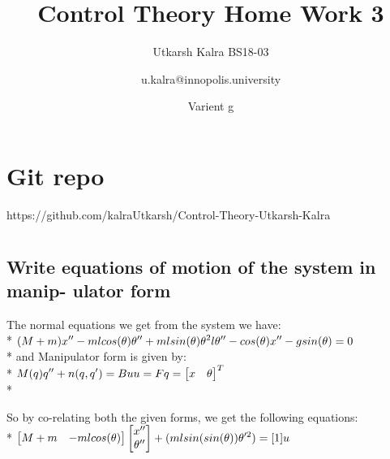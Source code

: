 \documentclass{article}
\title{Control Theory Home Work 3}
\author{Utkarsh Kalra BS18-03 \and u.kalra@innopolis.university }
\date{Varient g}
\begin{document}
\maketitle

\section{Git repo}
https://github.com/kalraUtkarsh/Control-Theory-Utkarsh-Kalra


\section{}
\subsection{Write equations of motion of the system in manip-
ulator form}

The normal equations we get from the system we have:\\*
$
{\centering}\displaystyle(M+m)x''-mlcos(\theta)\theta''+mlsin(\theta)\theta^2 \\*
l\theta''-cos(\theta)x''-gsin(\theta)=0\\*
$\\*
and Manipulator form is given by:\\*
$
\displaystyle M(q)q''+n(q,q')=Bu\\*
u = F\\*
q = \begin{bmatrix}
x & \theta\\
\end{bmatrix}^T\\*
$\\*

So by co-relating both the given forms, we get the following equations:\\*
$
\displaystyle
\begin{bmatrix}
M+m & -mlcos(\theta)\\
\end{bmatrix}
\begin{bmatrix}
x''\\
\theta''\\
\end{bmatrix}
+
(mlsin(sin(\theta))\theta'^2)
=
[1]u
\\*
$
\end{document}
